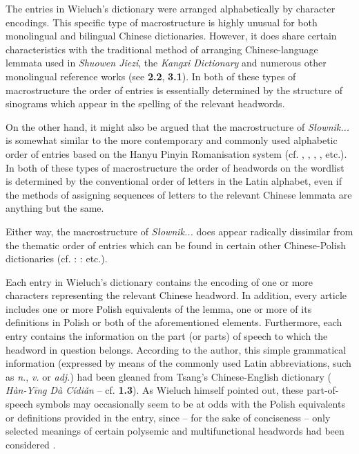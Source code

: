 \documentclass[output=paper,colorlinks,citecolor=brown,arabicfont,chinesefont]{langscibook}
\begin{document}
The entries in Wieluch's dictionary were arranged alphabetically by character encodings. This specific type of macrostructure is highly unusual for both monolingual and bilingual Chinese dictionaries. However, it does share certain characteristics with the traditional method of arranging Chinese-language lemmata used in \emph{Shuowen Jiezi}, the \emph{Kangxi Dictionary} and numerous other monolingual reference works (see \textbf{2.2}, \textbf{3.1}). In both of these types of macrostructure the order of entries is essentially determined by the structure of sinograms which appear in the spelling of the relevant headwords. 

On the other hand, it might also be argued that the macrostructure of \emph{Słownik...} is somewhat similar to the more contemporary and commonly used alphabetic order of entries based on the Hanyu Pinyin Romanisation system (cf. \citealt{Xia_Chen_2009},  \citealt{XuYao_2010},  \citealt{Kocyba-grychKolecka2012}, \citealt{AchingerRadziwill2015}, etc.). In both of these types of macrostructure the order of headwords on the wordlist is determined by the conventional order of letters in the Latin alphabet, even if the methods of assigning sequences of letters to the relevant Chinese lemmata are anything but the same.

Either way, the macrostructure of \emph{Słownik...} does appear radically dissimilar from the thematic order of entries which can be found in certain other Chinese-Polish dictionaries (cf. \citealt{Wu_yuemei_2010}:  \citealt{Yin_xiangfeng_2013}:  etc.).

Each entry in Wieluch's dictionary contains the encoding of one or more characters representing the relevant Chinese headword. In addition, every article includes one or more Polish equivalents of the lemma, one or more of its definitions in Polish or both of the aforementioned elements. Furthermore, each entry contains the information on the part (or parts) of speech to which the headword in question belongs. According to the author, this simple grammatical information (expressed by means of the commonly used Latin abbreviations, such as \emph{n.}, \emph{v.} or \emph{adj.}) had been gleaned from Tsang's Chinese-English dictionary ({} \emph{Hàn-Yīng Dà Cídiǎn} – cf. \textbf{1.3}). As Wieluch himself pointed out, these part-of-speech symbols may occasionally seem to be at odds with the Polish equivalents or definitions provided in the entry, since – for the sake of conciseness – only selected meanings of certain polysemic and multifunctional headwords had been considered \citep[11\textsubscript{p}]{Wieluch1936}.
\end{document}
